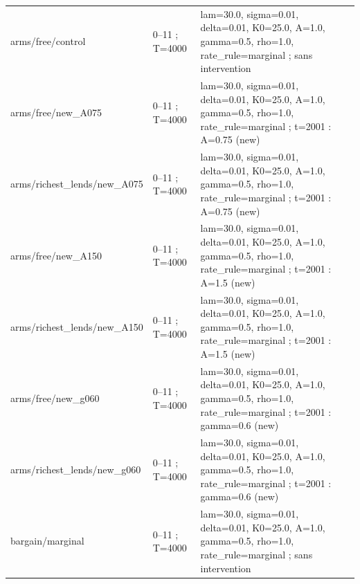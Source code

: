 {\begin{longtable}{@{}p{.27\linewidth}p{.14\linewidth}p{.53\linewidth}@{}}
arms/\allowbreak{}free/\allowbreak{}control & 0--11 ; T=4000 & lam=30.0,\allowbreak{}  sigma=0.01,\allowbreak{}  delta=0.01,\allowbreak{}  K0=25.0,\allowbreak{}  A=1.0,\allowbreak{}  gamma=0.5,\allowbreak{}  rho=1.0,\allowbreak{}  rate\_\allowbreak{}rule=marginal ; sans intervention \\
arms/\allowbreak{}free/\allowbreak{}new\_\allowbreak{}A075 & 0--11 ; T=4000 & lam=30.0,\allowbreak{}  sigma=0.01,\allowbreak{}  delta=0.01,\allowbreak{}  K0=25.0,\allowbreak{}  A=1.0,\allowbreak{}  gamma=0.5,\allowbreak{}  rho=1.0,\allowbreak{}  rate\_\allowbreak{}rule=marginal ; t=2001 : A=0.75 (new) \\
arms/\allowbreak{}richest\_\allowbreak{}lends/\allowbreak{}new\_\allowbreak{}A075 & 0--11 ; T=4000 & lam=30.0,\allowbreak{}  sigma=0.01,\allowbreak{}  delta=0.01,\allowbreak{}  K0=25.0,\allowbreak{}  A=1.0,\allowbreak{}  gamma=0.5,\allowbreak{}  rho=1.0,\allowbreak{}  rate\_\allowbreak{}rule=marginal ; t=2001 : A=0.75 (new) \\
arms/\allowbreak{}free/\allowbreak{}new\_\allowbreak{}A150 & 0--11 ; T=4000 & lam=30.0,\allowbreak{}  sigma=0.01,\allowbreak{}  delta=0.01,\allowbreak{}  K0=25.0,\allowbreak{}  A=1.0,\allowbreak{}  gamma=0.5,\allowbreak{}  rho=1.0,\allowbreak{}  rate\_\allowbreak{}rule=marginal ; t=2001 : A=1.5 (new) \\
arms/\allowbreak{}richest\_\allowbreak{}lends/\allowbreak{}new\_\allowbreak{}A150 & 0--11 ; T=4000 & lam=30.0,\allowbreak{}  sigma=0.01,\allowbreak{}  delta=0.01,\allowbreak{}  K0=25.0,\allowbreak{}  A=1.0,\allowbreak{}  gamma=0.5,\allowbreak{}  rho=1.0,\allowbreak{}  rate\_\allowbreak{}rule=marginal ; t=2001 : A=1.5 (new) \\
arms/\allowbreak{}free/\allowbreak{}new\_\allowbreak{}g060 & 0--11 ; T=4000 & lam=30.0,\allowbreak{}  sigma=0.01,\allowbreak{}  delta=0.01,\allowbreak{}  K0=25.0,\allowbreak{}  A=1.0,\allowbreak{}  gamma=0.5,\allowbreak{}  rho=1.0,\allowbreak{}  rate\_\allowbreak{}rule=marginal ; t=2001 : gamma=0.6 (new) \\
arms/\allowbreak{}richest\_\allowbreak{}lends/\allowbreak{}new\_\allowbreak{}g060 & 0--11 ; T=4000 & lam=30.0,\allowbreak{}  sigma=0.01,\allowbreak{}  delta=0.01,\allowbreak{}  K0=25.0,\allowbreak{}  A=1.0,\allowbreak{}  gamma=0.5,\allowbreak{}  rho=1.0,\allowbreak{}  rate\_\allowbreak{}rule=marginal ; t=2001 : gamma=0.6 (new) \\
bargain/\allowbreak{}marginal & 0--11 ; T=4000 & lam=30.0,\allowbreak{}  sigma=0.01,\allowbreak{}  delta=0.01,\allowbreak{}  K0=25.0,\allowbreak{}  A=1.0,\allowbreak{}  gamma=0.5,\allowbreak{}  rho=1.0,\allowbreak{}  rate\_\allowbreak{}rule=marginal ; sans intervention \\

\end{longtable}}

